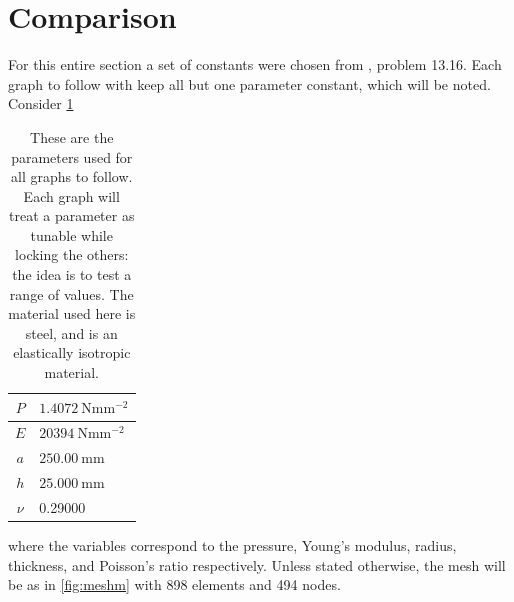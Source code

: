 \documentclass[12pt,times,twocolumn,3p]{elsarticle}
\begin{document}
\section{Comparison} \label{sec:comp}
For this entire section a set of constants were chosen from \cite{boresi}, problem
13.16. Each graph to follow with keep all but one parameter constant, which will
be noted. Consider \cref{tab:params}
\begin{table}[ht]
    \centering
    \begin{tabular}{ ||c|l|| }
        \hline
        $P$ & $\SI{1.4072}{\newton\milli\meter^{-2}}$ \\
        \hline
        $E$ & $\SI{20394}{\newton\milli\meter^{-2}}$ \\
        \hline
        $a$ & $\SI{250.00}{\milli\meter}$ \\
        \hline
        $h$ & $\SI{25.000}{\milli\meter}$ \\
        \hline
        $\nu$ & 0.29000 \\
        \hline
    \end{tabular}
    \caption{These are the parameters used for all graphs to follow. Each graph
    will treat a parameter as tunable while locking the others: the idea is to
    test a range of values. The material used here is steel, and is an
    elastically isotropic material.}
    \label{tab:params}
\end{table}
where the variables correspond to the pressure, Young's modulus, radius, thickness,
and Poisson's ratio respectively. Unless stated otherwise, the mesh will be as in
\cref{fig:meshm} with 898 elements and 494 nodes. 
\end{document}
